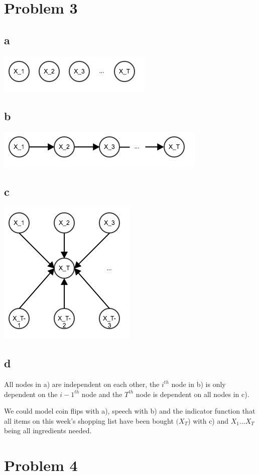 \documentclass[twoside]{homework}
\begin{document}
\section*{Problem 3}
\subsection*{a}
\includegraphics[scale=0.5]{3a}
\subsection*{b}
\includegraphics[scale=0.5]{3b}
\subsection*{c}
\includegraphics[scale=0.5]{3c}
\subsection*{d}
All nodes in a) are independent on each other, the $i^{th}$ node in b) is only dependent on the $i-1^{th}$ node and the $T^{th}$ node is dependent on all nodes in c).

We could model coin flips with a), speech with b) and the indicator function that all items on this week's shopping list have been bought $(X_T$) with c) and $X_1 ... X_T$ being all ingredients needed. 

\section*{Problem 4}
\end{document}
